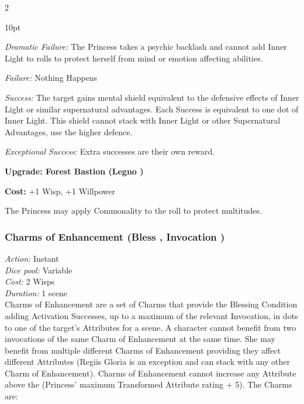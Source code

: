 \begin{multicols}{2}
\begin{myindentpar}{10pt}

\emph{Dramatic Failure:} The Princess takes a psychic backlash and cannot add Inner Light to rolls to protect herself from mind or emotion affecting abilities. 

\emph{Failure:} Nothing Happens 

\emph{Success:} The target gains mental shield equivalent to the defensive effects of Inner Light or similar supernatural advantages. Each Success is equivalent to one dot of Inner Light. This shield cannot stack with Inner Light or other Supernatural Advantages, use the higher defence.

\emph{Exceptional Success:} Extra successes are their own reward. 

\textbf{Upgrade: Forest Bastion (Legno \textbullet\textbullet\textbullet\textbullet)}

\textbf{Cost:} +1 Wisp, +1 Willpower

The Princess may apply Commonality to the roll to protect multitudes.

\end{myindentpar}

\subsubsection*{Charms of Enhancement (Bless \textbullet\textbullet\textbullet, Invocation \textbullet\textbullet)}

\emph{Action:} Instant \\ 

\emph{Dice pool:} Variable \\

\emph{Cost:} 2 Wisps\\

\emph{Duration:} 1 scene\\

\noindent Charms of Enhancement are a set of Charms that provide the Blessing Condition adding Activation Successes, up to a maximum of the relevant Invocation, in dots to one of the target's Attributes for a scene. A character cannot benefit from two invocations of the same Charm of Enhancement at the same time. She may benefit from multiple different Charms of Enhancement providing they affect different Attributes (Regiis Gloria is an exception and can stack with any other Charm of Enhancement). Charms of Enhancement cannot increase any Attribute above the (Princess' maximum Transformed Attribute rating + 5). The Charms are: 


\end{multicols}

